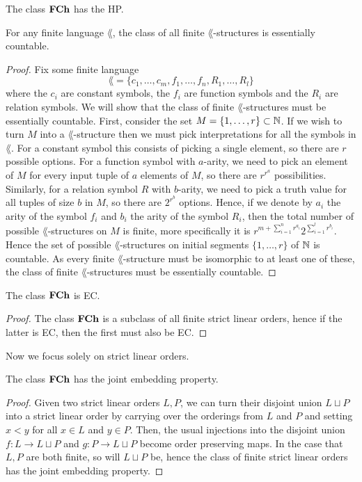 \begin{cor}
  The class $\textbf{FCh}$ has the HP.
\end{cor}

\begin{prop}
  For any finite language $\lang$, the class of all finite $\lang$-structures is essentially
  countable.
\end{prop}
\begin{proof}
  Fix some finite language
  \begin{equation*}
    \lang = \{c_1, \dots, c_m, f_1, \dots, f_n, R_1, \dots, R_l \}
  \end{equation*}
  where the $c_i$ are constant symbols, the $f_i$ are function symbols and the $R_i$ are relation
  symbols. We will show that the class of finite $\lang$-structures must be essentially countable.
  First, consider the set $M = \{1,\dots,r\} \subset \mathbb{N}$. If we wish to turn $M$ into a
  $\lang$-structure then we must pick interpretations for all the symbols in $\lang$. For a constant
  symbol this consists of picking a single element, so there are $r$ possible options. For a
  function symbol with $a$-arity, we need to pick an element of $M$ for every input tuple of $a$
  elements of $M$, so there are $r^{r^a}$ possibilities. Similarly, for a relation symbol $R$ with
  $b$-arity, we need to pick a truth value for all tuples of size $b$ in $M$, so there are $2^{r^b}$
  options. Hence, if we denote by $a_i$ the arity of the symbol $f_i$ and $b_i$ the arity of the
  symbol $R_i$, then the total number of possible $\lang$-structures on $M$ is finite, more
  specifically it is $r^{m + \sum_{i=1}^{n} r^{a_i}} 2^{\sum_{i=1}^{l} r^{b_i}}$. Hence the set of
  possible $\lang$-structures on initial segments $\{1,\dots,r\}$ of $\mathbb{N}$ is countable. As every
  finite $\lang$-structure must be isomorphic to at least one of these, the class of finite
  $\lang$-structures must be essentially countable.
\end{proof}

\begin{cor}
  The class $\textbf{FCh}$ is EC.
\end{cor}
\begin{proof}
  The class $\textbf{FCh}$ is a subclass of all finite strict linear orders, hence if the latter is EC,
  then the first must also be EC.
\end{proof}

Now we focus solely on strict linear orders.

\begin{prop}
  The class $\textbf{FCh}$ has the joint embedding property.
\end{prop}
\begin{proof}
  Given two strict linear orders $L,P$, we can turn their disjoint union $L \sqcup P$ into a
  strict linear order by carrying over the orderings from $L$ and $P$ and setting
  $x < y$ for all $x \in L$ and $y \in P$. Then, the usual injections into the disjoint union
  $f : L \to L \sqcup P$ and $g : P \to L \sqcup P$ become order preserving maps. In the case
  that $L,P$ are both finite, so will $L \sqcup P$ be, hence the class of finite strict
  linear orders has the joint embedding property.
\end{proof}


